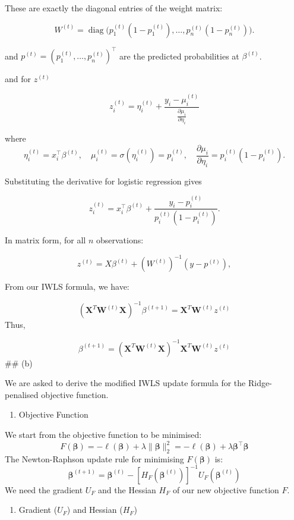 \documentclass[12pt,halfline,a4paper,]{ouparticle}
\providecommand{\tightlist}{%
  \setlength{\itemsep}{0pt}\setlength{\parskip}{0pt}}
\begin{document}
These are exactly the diagonal entries of the weight matrix:

\[
W^{(t)} = \operatorname{diag}\Big(p_1^{(t)} (1 - p_1^{(t)}), \dots, p_n^{(t)} (1 - p_n^{(t)})\Big).
\]

and \(p^{(t)} = (p_1^{(t)}, \dots, p_n^{(t)})^\top\) are the predicted
probabilities at \(\beta^{(t)}\).

and for \(z^{(t)}\)

\[z_i^{(t)} = \eta_i^{(t)} + \frac{y_i - \mu_i^{(t)}}{\frac{\partial \mu_i}{\partial \eta_i}}\]

where \[
\eta_i^{(t)} = x_i^\top \beta^{(t)}, \quad \mu_i^{(t)} = \sigma(\eta_i^{(t)}) = p_i^{(t)}, \quad \frac{\partial \mu_i}{\partial \eta_i} = p_i^{(t)} (1 - p_i^{(t)}).
\]

Substituting the derivative for logistic regression gives

\[
z_i^{(t)} = x_i^\top \beta^{(t)} + \frac{y_i - p_i^{(t)}}{p_i^{(t)} (1 - p_i^{(t)})}.
\]

In matrix form, for all \(n\) observations:

\[
z^{(t)} = X \beta^{(t)} + (W^{(t)})^{-1} (y - p^{(t)}),
\]

From our IWLS formula, we have:

\[ (\textbf{X}^T \textbf{W}^{(t)} \textbf{X})^{-1} \beta^{(t+1)} = \textbf{X}^T \textbf{W}^{(t)} z^{(t)} \]
Thus,

\[\boxed{\beta^{(t+1)} = (\textbf{X}^T \textbf{W}^{(t)} \textbf{X})^{-1}\textbf{X}^T \textbf{W}^{(t)} z^{(t)}}   \]
\#\# (b)

We are asked to derive the modified IWLS update formula for the
Ridge-penalised objective function.

\begin{enumerate}
\def\labelenumi{\arabic{enumi}.}
\tightlist
\item
  Objective Function
\end{enumerate}

We start from the objective function to be minimised: \[
F(\boldsymbol{\beta}) = -\ell(\boldsymbol{\beta}) + \lambda \|\boldsymbol{\beta}\|_2^2 = -\ell(\boldsymbol{\beta}) + \lambda \boldsymbol{\beta}^\top \boldsymbol{\beta}
\] The Newton-Raphson update rule for minimising
\(F(\boldsymbol{\beta})\) is: \[
\boldsymbol{\beta}^{(t+1)} = \boldsymbol{\beta}^{(t)} - [H_F(\boldsymbol{\beta}^{(t)})]^{-1} U_F(\boldsymbol{\beta}^{(t)})
\] We need the gradient \(U_F\) and the Hessian \(H_F\) of our new
objective function \(F\).

\begin{enumerate}
\def\labelenumi{\arabic{enumi}.}
\setcounter{enumi}{2}
\tightlist
\item
  Gradient (\(U_F\)) and Hessian (\(H_F\))
\end{enumerate}
\end{document}
